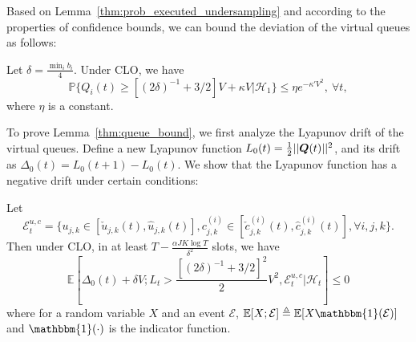 Based on Lemma~\ref{thm:prob_executed_undersampling} and according to the properties of confidence bounds, we can bound the deviation of the virtual queues as follows:
\begin{lemma} \label{thm:queue_bound} Let $\delta = \frac{\min_i b_i} {4}$. 
Under CLO,  we have
\begin{equation}
\mathbb{P}\{Q_i(t) \geq [(2\delta)^{-1} + 3/2] V + \kappa V|\mathcal{H}_1\} \leq \eta e^{-\kappa'  V^2}, ~\forall t,
\end{equation}
where $\eta$ is a constant.
\end{lemma}
To prove Lemma~\ref{thm:queue_bound}, we first analyze the Lyapunov drift of the virtual queues. 
Define a new Lyapunov function $L_0(t) = \frac{1}{2}||\boldsymbol{Q}(t)||^2$, and its drift as $\Delta_0(t) = L_0(t + 1) - L_0(t) $. 
We show that the Lyapunov function has a negative drift under certain conditions:\\
\begin{lemma} \label{thm:L0_drift_bound}
Let
{\small
\begin{equation}
\mathcal{E}^{u,c}_{t} = \big\{u_{j,k} \in [\check{u}_{j,k}(t), \hat{u}_{j,k}(t)], c^{(i)}_{j,k} \in [\check{c}^{(i)}_{j,k}(t), \hat{c}^{(i)}_{j,k}(t)], \forall i,j,k\big\}. \nonumber
\end{equation}
}
Then under CLO, in at least $T - \frac{\alpha JK \log T}{\delta^2}$ slots, we have
\begin{equation}
\mathbb{E}[\Delta_0(t) + \delta V; L_t > \frac{[(2\delta)^{-1} + 3/2]^2}{2} V^2,  \mathcal{E}^{u,c}_t| \mathcal{H}_t] \leq 0
\end{equation}
where for a random variable $X$ and an event $\mathcal{E}$, 
$\mathbb{E}[X; \mathcal{E}] \triangleq \mathbb{E}[X\mathbbm{1}(\mathcal{E})]$ and $\mathbbm{1}(\cdot)$ is the indicator function.
\end{lemma}

